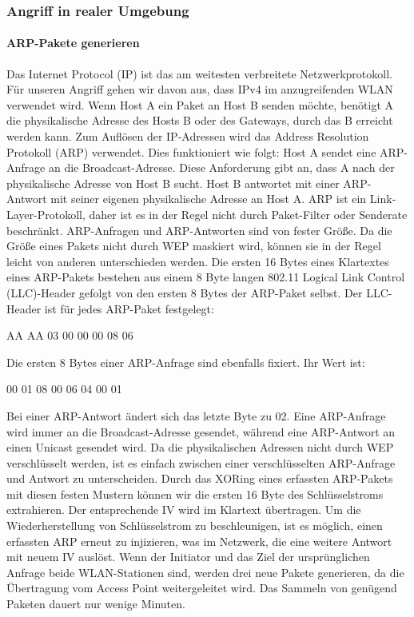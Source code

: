 \documentclass[10pt,a4paper]{article}
\begin{document}
\subsubsection{Angriff in realer Umgebung}

\paragraph{ARP-Pakete generieren}

Das Internet Protocol (IP) ist das am weitesten verbreitete Netzwerkprotokoll. Für
unseren Angriff gehen wir davon aus, dass IPv4 im anzugreifenden WLAN verwendet wird.
Wenn Host A ein Paket an Host B senden möchte, benötigt A die physikalische
Adresse des Hosts B oder des Gateways, durch das B erreicht werden kann.
Zum Auflösen der IP-Adressen wird das Address Resolution Protokoll (ARP) verwendet.
Dies funktioniert wie folgt: Host A sendet eine ARP-Anfrage an die Broadcast-Adresse. 
Diese Anforderung gibt an, dass A nach der physikalische Adresse von Host B sucht.  
Host B antwortet mit einer ARP-Antwort mit seiner eigenen physikalische Adresse an Host A. 
ARP ist ein Link-Layer-Protokoll, daher ist es in der Regel nicht durch Paket-Filter oder Senderate beschränkt.
ARP-Anfragen und ARP-Antworten sind von fester Größe. Da die Größe eines Pakets 
nicht durch WEP maskiert wird, können sie in der Regel leicht von anderen unterschieden werden.
Die ersten 16 Bytes eines Klartextes eines ARP-Pakets bestehen aus einem 8 Byte langen
802.11 Logical Link Control (LLC)-Header gefolgt von den ersten 8 Bytes der
ARP-Paket selbst. 
Der LLC-Header ist für jedes ARP-Paket festgelegt:\\
\begin{center}
	AA AA 03 00 00 00 08 06\\
\end{center}
Die ersten 8 Bytes einer ARP-Anfrage sind ebenfalls fixiert. Ihr Wert
ist:\\
\begin{center}
	00 01 08 00 06 04 00 01\\
\end{center}
Bei einer ARP-Antwort ändert sich das letzte Byte zu 02. Eine ARP-Anfrage wird immer an die Broadcast-Adresse gesendet, während eine ARP-Antwort an einen Unicast gesendet wird.
Da die physikalischen Adressen nicht durch WEP verschlüsselt werden, ist es einfach
zwischen einer verschlüsselten ARP-Anfrage und Antwort zu unterscheiden.
Durch das XORing eines erfassten ARP-Pakets mit diesen festen Mustern können wir die ersten 16 Byte des Schlüsselstroms extrahieren. 
Der entsprechende IV wird im Klartext übertragen.
Um die Wiederherstellung von Schlüsselstrom zu beschleunigen, ist es möglich, einen erfassten ARP erneut zu injizieren, was
im Netzwerk, die eine weitere Antwort mit neuem IV auslöst. 
Wenn der Initiator und das Ziel der ursprünglichen Anfrage 
beide WLAN-Stationen sind, werden drei neue Pakete generieren,
da die Übertragung vom Access Point weitergeleitet wird. 
Das Sammeln von genügend Paketen dauert nur wenige Minuten.
\end{document}
